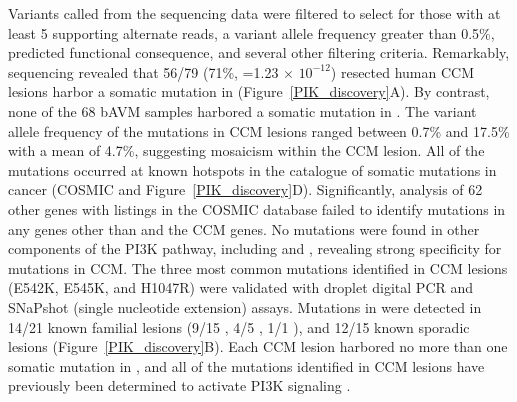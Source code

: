 Variants called from the sequencing data were filtered to select for those with at least 5 supporting alternate reads, a variant allele frequency greater than 0.5\%, predicted functional consequence, and several other filtering criteria. Remarkably, sequencing revealed that 56/79 (71\%, =1.23 $\times$ $10^{-12}$) resected human CCM lesions harbor a somatic mutation in  (Figure~\ref{PIK_discovery}A). By contrast, none of the 68 bAVM samples harbored a somatic mutation in . The variant allele frequency of the  mutations in CCM lesions ranged between 0.7\% and 17.5\% with a mean of 4.7\%, suggesting mosaicism within the CCM lesion. All of the  mutations occurred at known hotspots in the catalogue of somatic mutations in cancer (COSMIC and Figure~\ref{PIK_discovery}D). Significantly, analysis of 62 other genes with listings in the COSMIC database failed to identify mutations in any genes other than  and the CCM genes. No mutations were found in other components of the PI3K pathway, including  and , revealing strong specificity for  mutations in CCM. The three most common  mutations identified in CCM lesions (E542K, E545K, and H1047R) were validated with droplet digital PCR and SNaPshot (single nucleotide extension) assays. Mutations in  were detected in 14/21 known familial lesions (9/15 , 4/5 , 1/1 ), and 12/15 known sporadic lesions (Figure~\ref{PIK_discovery}B). Each CCM lesion harbored no more than one somatic mutation in , and all of the  mutations identified in CCM lesions have previously been determined to activate PI3K signaling \citep{dogruluk2015}.  

